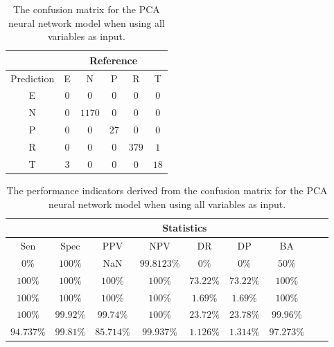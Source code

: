 \begin{table}[!ht]
	\centering
	\begin{tabular}{|c|c|c|c|c|c|}
		\hline
		 & \multicolumn{5}{|c|}{Reference} \\ \hline
		 Prediction & E & N & P & R & T \\ \hline
		 E & $0$ & $0$ & $0$ & $0$ & $0$ \\ \hline
		 N & $0$ & $1170$ & $0$ & $0$ & $0$ \\ \hline
		 P & $0$ & $0$ & $27$ & $0$ & $0$ \\ \hline
		 R & $0$ & $0$ & $0$ & $379$ & $1$ \\ \hline
		 T & $3$ & $0$ & $0$ & $0$ & $18$ \\ \hline
	\end{tabular}
	\caption{The confusion matrix for the PCA neural network model when using all variables as input.}
	\label{tab:cm:all:pcaNNet}
\end{table}

\begin{table}[!ht]
	\centering
	\begin{tabular}{|c|c|c|c|c|c|c|c|c|}
		\hline
		 & \multicolumn{7}{c|}{Statistics} \\ \hline
		Sen & Spec & PPV & NPV & DR & DP & BA \\ \hline
		$0\%$ & $100\%$ & NaN & $99.8123\%$ & $0\%$ & $0\%$ & $50\%$ \\ \hline
		$100\%$ & $100\%$ & $100\%$ & $100\%$ & $73.22\%$ & $73.22\%$ & $100\%$ \\ \hline
		$100\%$ & $100\%$ & $100\%$ & $100\%$ & $1.69\%$ & $1.69\%$ & $100\%$ \\ \hline
		$100\%$ & $99.92\%$ & $99.74\%$ & $100\%$ & $23.72\%$ & $23.78\%$ & $99.96\%$ \\ \hline
		$94.737\%$ & $99.81\%$ & $85.714\%$ & $99.937\%$ & $1.126\%$ & $1.314\%$ & $97.273\%$ \\ \hline
	\end{tabular}
	\caption{The performance indicators derived from the confusion matrix for the PCA neural network model when using all variables as input.}
	\label{tab:cs:all:pcaNNet}
\end{table}

